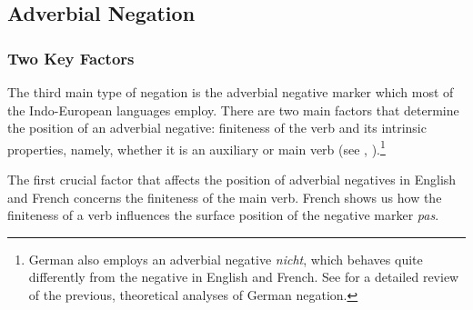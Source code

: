 \documentclass[output=paper]{langsci/langscibook}
\begin{document}
\subsection{Adverbial Negation}

\subsubsection{Two Key Factors}

The third main type of negation is
the adverbial negative marker which most of the Indo-European
languages employ. There are two main factors
that determine the position of an adverbial negative: finiteness of
the verb and its intrinsic properties, namely, whether it is an auxiliary
or main verb (see \citet{Kim:00}, \citet{KS:02}).\footnote{German also
employs an adverbial negative {\it nicht}, which behaves quite
differently from the negative in English and French. See \citet{Muller:16}
for a detailed review of the previous, theoretical analyses of German negation.}


The first crucial factor that affects  the position of adverbial
negatives in English and French concerns the finiteness of the main verb.
French shows us how the finiteness of a verb influences the
surface position of the negative marker {\it pas}.



\begin{exe}
\ex \begin{xlist}
\end{xlist}
\end{exe}


\begin{exe}
\ex \begin{xlist}
\end{xlist}
\end{exe}
\end{document}
